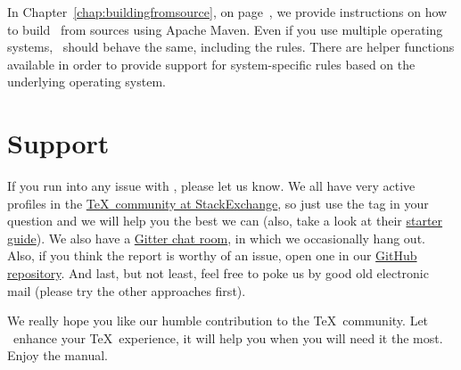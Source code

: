 In Chapter~\ref{chap:buildingfromsource}, on page~\pageref{chap:buildingfromsource}, we provide instructions on how to build \arara\ from sources using Apache Maven. Even if you use multiple operating systems, \arara\ should behave the same, including the rules. There are helper functions available in order to provide support for system-specific rules based on the underlying operating system.

\section{Support}
\label{sec:support}

If you run into any issue with \arara, please let us know. We all have very active profiles in the \href{https://tex.stackexchange.com/}{\TeX\ community at StackExchange}, so just use the  tag in your question and we will help you the best we can (also, take a look at their \href{https://tex.meta.stackexchange.com/q/1436}{starter guide}).  We also have a \href{https://gitter.im/cereda/arara}{Gitter chat room}, in which we occasionally hang out. Also, if you think the report is worthy of an issue, open one in our \href{https://github.com/cereda/arara/issues}{GitHub repository}. And last, but not least, feel free to poke us by good old electronic mail (please try the other approaches first).

We really hope you like our humble contribution to the \TeX\ community. Let \arara\ enhance your \TeX\ experience, it will help you when you will need it the most. Enjoy the manual.
